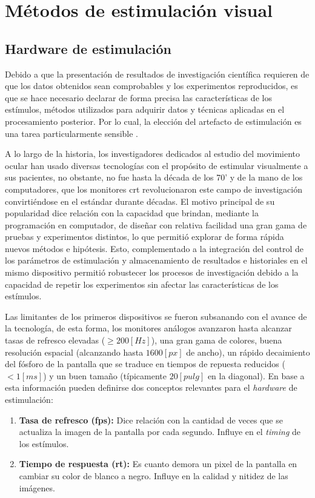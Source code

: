 \documentclass[../main.tex]{subfiles}
\begin{document}
	\section{Métodos de estimulación visual}
	\label{sec:02_sistemas_de_estimulacion_visual}
		\subsection{Hardware de estimulación}
		\label{sub:02_hardware_de_estimulacion}
			Debido a que la presentación de resultados de investigación científica requieren de que los datos obtenidos sean comprobables y los experimentos reproducidos, es que se hace necesario declarar de forma precisa las características de los estímulos, métodos utilizados para adquirir datos y técnicas aplicadas en el procesamiento posterior. Por lo cual, la elección del artefacto de estimulación es una tarea particularmente sensible \cite{article:monitor_beuer}.

			A lo largo de la historia, los investigadores dedicados al estudio del movimiento ocular han usado diversas tecnologías con el propósito de estimular visualmente a sus pacientes, no obstante, no fue hasta la década de los 70' y de la mano de los computadores, que los monitores \acrshort{crt} revolucionaron este campo de investigación convirtiéndose en el estándar durante décadas. El motivo principal de su popularidad dice relación con la capacidad que brindan, mediante la programación en computador, de diseñar con relativa facilidad una gran gama de pruebas y experimentos distintos, lo que permitió explorar de forma rápida nuevos métodos e hipótesis. Esto, complementado a la integración del control de los parámetros de estimulación y almacenamiento de resultados e historiales en el mismo dispositivo permitió robustecer los procesos de investigación debido a la capacidad de repetir los experimentos sin afectar las características de los estímulos. 

			Las limitantes de los primeros dispositivos se fueron subsanando con el avance de la tecnología, de esta forma, los monitores análogos avanzaron hasta alcanzar tasas de refresco elevadas ($\geq 200[Hz]$), una gran gama de colores, buena resolución espacial (alcanzando hasta $1600[px]$ de ancho), un rápido decaimiento del fósforo de la pantalla que se traduce en tiempos de repuesta reducidos ($< 1[ms]$) y un buen tamaño (típicamente $20[pulg]$ en la diagonal). En base a esta información pueden definirse dos conceptos relevantes para el \textit{hardware} de estimulación: 
			\begin{enumerate}\setlength\itemsep{-0.5em}
				\item \textbf{Tasa de refresco (\acrshort{fps}):} Dice relación con la cantidad de veces que se actualiza la imagen de la pantalla por cada segundo. Influye en el \textit{timing} de los estímulos.
				\item \textbf{Tiempo de respuesta (\acrshort{rt}):} Es cuanto demora un pixel de la pantalla en cambiar su color de blanco a negro. Influye en la calidad y nitidez de las imágenes. 
			\end{enumerate}
\end{document}
